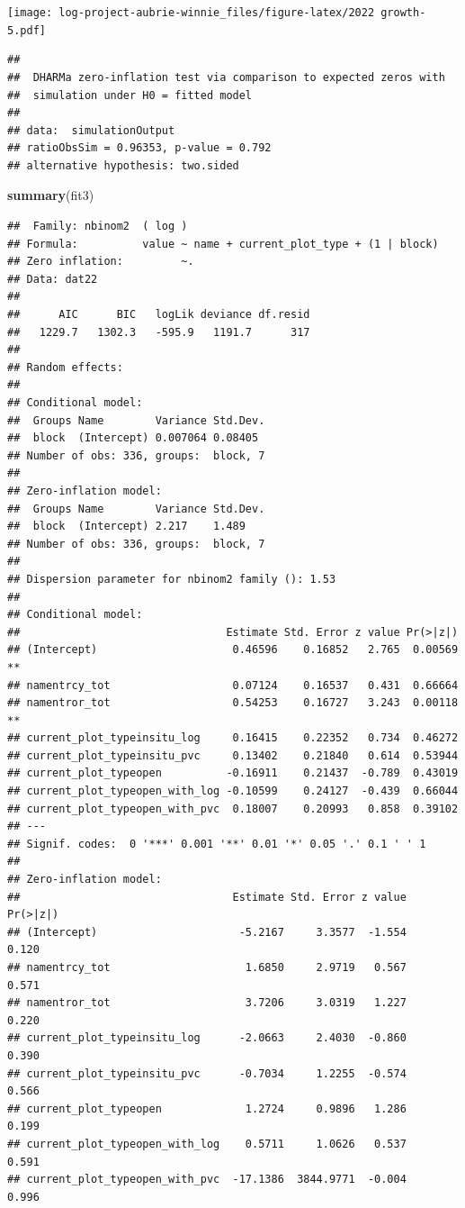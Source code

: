 \documentclass[
]{article}
\newenvironment{Shaded}{\begin{snugshade}}{\end{snugshade}}
\newcommand{\FunctionTok}[1]{\textcolor[rgb]{0.13,0.29,0.53}{\textbf{#1}}}
\newcommand{\NormalTok}[1]{#1}
\begin{document}
\texttt{[image: log-project-aubrie-winnie\_files/figure-latex/2022 growth-5.pdf]}

\begin{verbatim}
## 
##  DHARMa zero-inflation test via comparison to expected zeros with
##  simulation under H0 = fitted model
## 
## data:  simulationOutput
## ratioObsSim = 0.96353, p-value = 0.792
## alternative hypothesis: two.sided
\end{verbatim}

\begin{Shaded}
\begin{Highlighting}[]
\FunctionTok{summary}\NormalTok{(fit3)}
\end{Highlighting}
\end{Shaded}

\begin{verbatim}
##  Family: nbinom2  ( log )
## Formula:          value ~ name + current_plot_type + (1 | block)
## Zero inflation:         ~.
## Data: dat22
## 
##      AIC      BIC   logLik deviance df.resid 
##   1229.7   1302.3   -595.9   1191.7      317 
## 
## Random effects:
## 
## Conditional model:
##  Groups Name        Variance Std.Dev.
##  block  (Intercept) 0.007064 0.08405 
## Number of obs: 336, groups:  block, 7
## 
## Zero-inflation model:
##  Groups Name        Variance Std.Dev.
##  block  (Intercept) 2.217    1.489   
## Number of obs: 336, groups:  block, 7
## 
## Dispersion parameter for nbinom2 family (): 1.53 
## 
## Conditional model:
##                                Estimate Std. Error z value Pr(>|z|)   
## (Intercept)                     0.46596    0.16852   2.765  0.00569 **
## namentrcy_tot                   0.07124    0.16537   0.431  0.66664   
## namentror_tot                   0.54253    0.16727   3.243  0.00118 **
## current_plot_typeinsitu_log     0.16415    0.22352   0.734  0.46272   
## current_plot_typeinsitu_pvc     0.13402    0.21840   0.614  0.53944   
## current_plot_typeopen          -0.16911    0.21437  -0.789  0.43019   
## current_plot_typeopen_with_log -0.10599    0.24127  -0.439  0.66044   
## current_plot_typeopen_with_pvc  0.18007    0.20993   0.858  0.39102   
## ---
## Signif. codes:  0 '***' 0.001 '**' 0.01 '*' 0.05 '.' 0.1 ' ' 1
## 
## Zero-inflation model:
##                                 Estimate Std. Error z value Pr(>|z|)
## (Intercept)                      -5.2167     3.3577  -1.554    0.120
## namentrcy_tot                     1.6850     2.9719   0.567    0.571
## namentror_tot                     3.7206     3.0319   1.227    0.220
## current_plot_typeinsitu_log      -2.0663     2.4030  -0.860    0.390
## current_plot_typeinsitu_pvc      -0.7034     1.2255  -0.574    0.566
## current_plot_typeopen             1.2724     0.9896   1.286    0.199
## current_plot_typeopen_with_log    0.5711     1.0626   0.537    0.591
## current_plot_typeopen_with_pvc  -17.1386  3844.9771  -0.004    0.996
\end{verbatim}
\end{document}
